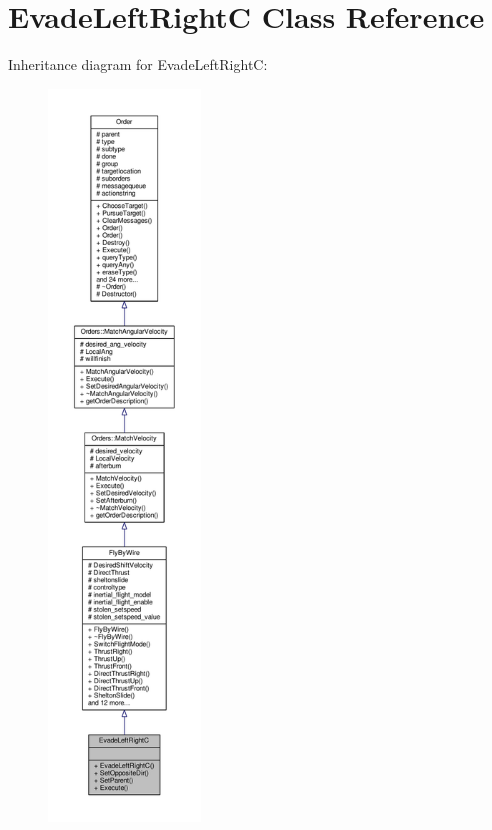 \hypertarget{classEvadeLeftRightC}{}\section{Evade\+Left\+RightC Class Reference}
\label{classEvadeLeftRightC}


Inheritance diagram for Evade\+Left\+RightC\+:
\nopagebreak
\begin{figure}[H]
\begin{center}
\leavevmode
\includegraphics[height=550pt]{d0/dc6/classEvadeLeftRightC__inherit__graph}
\end{center}
\end{figure}


